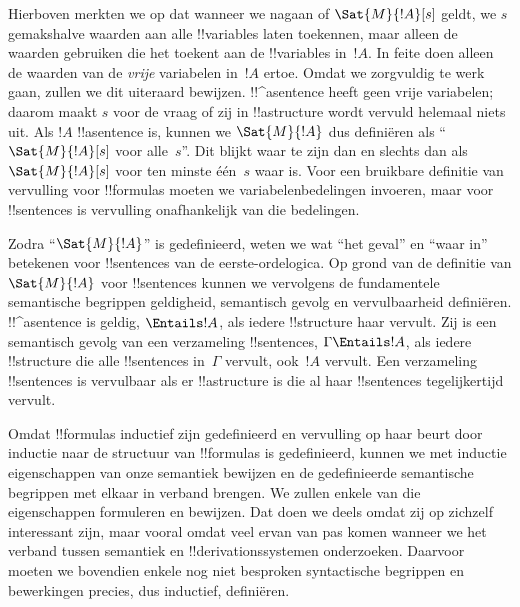 \documentclass[../../../include/open-logic-section]{subfiles}
\begin{document}


Hierboven merkten we op dat wanneer we nagaan of $\Sat{M}{!A}[s]$
geldt, we $s$ gemakshalve waarden aan alle !!{variable}s laten
toekennen, maar alleen de waarden gebruiken die het toekent aan de
!!{variable}s in~$!A$. In feite doen alleen de waarden van de
\emph{vrije} variabelen in~$!A$ ertoe. Omdat we zorgvuldig te werk
gaan, zullen we dit uiteraard bewijzen. !!^a{sentence} heeft geen vrije
variabelen; daarom maakt $s$ voor de vraag of zij in !!a{structure}
wordt vervuld helemaal niets uit. Als $!A$ !!a{sentence} is, kunnen we
$\Sat{M}{!A}$ dus definiëren als ``$\Sat{M}{!A}[s]$ voor alle~$s$''.
Dit blijkt waar te zijn dan en slechts dan als $\Sat{M}{!A}[s]$ voor
ten minste één~$s$ waar is. Voor een bruikbare definitie van vervulling
voor !!{formula}s moeten we variabelenbedelingen invoeren, maar voor
!!{sentence}s is vervulling onafhankelijk van die bedelingen.

Zodra ``$\Sat{M}{!A}$'' is gedefinieerd, weten we wat ``het geval'' en
``waar in'' betekenen voor !!{sentence}s van de eerste-ordelogica. Op
grond van de definitie van $\Sat{M}{!A}$ voor !!{sentence}s kunnen we
vervolgens de fundamentele semantische begrippen geldigheid, semantisch
gevolg en vervulbaarheid definiëren. !!^a{sentence} is geldig,
$\Entails !A$, als iedere !!{structure} haar vervult. Zij is een
semantisch gevolg van een verzameling !!{sentence}s,
$\Gamma \Entails !A$, als iedere !!{structure} die alle !!{sentence}s
in~$\Gamma$ vervult, ook~$!A$ vervult. Een verzameling !!{sentence}s is
vervulbaar als er !!a{structure} is die al haar !!{sentence}s
tegelijkertijd vervult.

Omdat !!{formula}s inductief zijn gedefinieerd en vervulling op haar
beurt door inductie naar de structuur van !!{formula}s is gedefinieerd,
kunnen we met inductie eigenschappen van onze semantiek bewijzen en de
gedefinieerde semantische begrippen met elkaar in verband brengen. We
zullen enkele van die eigenschappen formuleren en bewijzen. Dat doen we
deels omdat zij op zichzelf interessant zijn, maar vooral omdat veel
ervan van pas komen wanneer we het verband tussen semantiek en
!!{derivation}ssystemen onderzoeken. Daarvoor moeten we bovendien enkele
nog niet besproken syntactische begrippen en bewerkingen precies, dus
inductief, definiëren.
\end{document}
